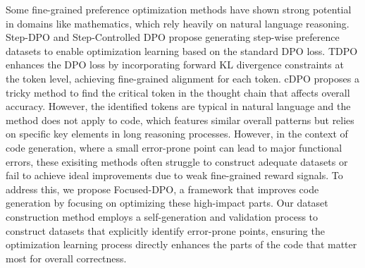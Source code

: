 Some fine-grained preference optimization methods \cite{rafailov2024direct, lai2024step, stepctrldpo,tdpo, cdpo} have shown strong potential in domains like mathematics, which rely heavily on natural language reasoning. Step-DPO \cite{lai2024step} and Step-Controlled DPO \cite{stepctrldpo} propose generating step-wise preference datasets to enable optimization learning based on the standard DPO loss. TDPO \cite{tdpo} enhances the DPO loss by incorporating forward KL divergence constraints at the token level, achieving fine-grained alignment for each token. cDPO \cite{cdpo} proposes a tricky method to find the critical token in the thought chain that affects overall accuracy. However, the identified tokens are typical in natural language and the method does not apply to code, which features similar overall patterns but relies on specific key elements in long reasoning processes.
However, in the context of code generation, where a small error-prone point can lead to major functional errors, these exisiting methods often struggle to construct adequate datasets or fail to achieve ideal improvements due to weak fine-grained reward signals.
To address this, we propose Focused-DPO, a framework that improves code generation by focusing on optimizing these high-impact parts. 
Our dataset construction method employs a self-generation and validation process to construct datasets that explicitly identify error-prone points, ensuring the optimization learning process directly enhances the parts of the code that matter most for overall correctness.